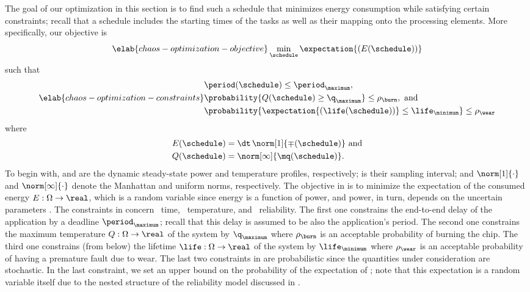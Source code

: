 The goal of our optimization in this section is to find such a schedule
\schedule that minimizes energy consumption while satisfying certain
constraints; recall that a schedule includes the starting times of the tasks as
well as their mapping onto the processing elements. More specifically, our
objective is
\begin{equation} \elab{chaos-optimization-objective}
  \min_{\schedule} \expectation{(E(\schedule))}
\end{equation}
such that
\begin{equation} \elab{chaos-optimization-constraints}
  \begin{split}
    & \period(\schedule) \leq \period_\maximum, \\
    & \probability{Q(\schedule) \geq \q_\maximum} \leq \rho_\burn, \text{ and} \\
    & \probability{\expectation{\left(\life(\schedule)\right)} \leq \life_\minimum} \leq \rho_\wear
  \end{split}
\end{equation}
where
\begin{align*}
  & E(\schedule) = \dt \, \norm[1]{\mp(\schedule)} \text{ and} \\
  & Q(\schedule) = \norm[\infty]{\mq(\schedule)}.
\end{align*}
To begin with, \mp and \mq are the dynamic steady-state power and temperature
profiles, respectively; \dt is their sampling interval; and $\norm[1]{\cdot}$
and $\norm[\infty]{\cdot}$ denote the Manhattan and uniform norms, respectively.
The objective in  is to minimize the
expectation of the consumed energy $E: \Omega \to \real$, which is a random
variable since energy is a function of power, and power, in turn, depends on the
uncertain parameters \vu. The constraints in
 concern \one~time, \two~temperature, and
\three~reliability. The first one constrains the end-to-end delay \period of the
application by a deadline $\period_\maximum$; recall that this delay is assumed
to be also the application's period. The second one constrains the maximum
temperature $Q: \Omega \to \real$ of the system by $\q_\maximum$ where
$\rho_\burn$ is an acceptable probability of burning the chip. The third one
constrains (from below) the lifetime $\life: \Omega \to \real$ of the system by
$\life_\minimum$ where $\rho_\wear$ is an acceptable probability of having a
premature fault due to wear. The last two constraints in
 are probabilistic since the quantities
under consideration are stochastic. In the last constraint, we set an upper
bound on the probability of the expectation of \life; note that this expectation
is a random variable itself due to the nested structure of the reliability model
discussed in .

